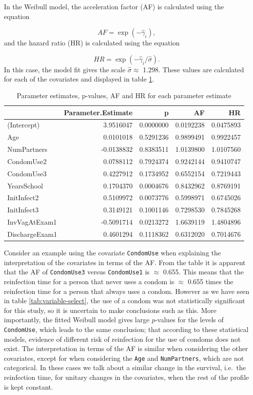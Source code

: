 \documentclass[
]{article}
\begin{document}
In the Weibull model, the acceleration factor (AF) is calculated using the equation

\[
AF = \exp(-\hat{\gamma}_i),
\]
and the hazard ratio (HR) is calculated using the equation

\[
HR = \exp(-\hat{\gamma}_i/\hat{\sigma}).
\]
In this case, the model fit gives the scale \(\hat{\sigma} \approx\) 1.298. These values are calculated for each of the covariates and displayed in table \ref{tab:Weibull-table}.

\begin{table}

\caption{\label{tab:Weibull-table}Parameter estimates, p-values, AF and HR for each parameter estimate}
\centering
\begin{tabular}[t]{l|r|r|r|r}
\hline
  & Parameter.Estimate & p & AF & HR\\
\hline
(Intercept) & 3.9516047 & 0.0000000 & 0.0192238 & 0.0475893\\
\hline
Age & 0.0101018 & 0.5291236 & 0.9899491 & 0.9922457\\
\hline
NumPartners & -0.0138832 & 0.8383511 & 1.0139800 & 1.0107560\\
\hline
CondomUse2 & 0.0788112 & 0.7924374 & 0.9242144 & 0.9410747\\
\hline
CondomUse3 & 0.4227912 & 0.1734952 & 0.6552154 & 0.7219443\\
\hline
YearsSchool & 0.1704370 & 0.0004676 & 0.8432962 & 0.8769191\\
\hline
InitInfect2 & 0.5109972 & 0.0073776 & 0.5998971 & 0.6745026\\
\hline
InitInfect3 & 0.3149121 & 0.1001146 & 0.7298530 & 0.7845268\\
\hline
InvVagAtExam1 & -0.5091714 & 0.0213272 & 1.6639119 & 1.4804896\\
\hline
DischargeExam1 & 0.4601294 & 0.1118362 & 0.6312020 & 0.7014676\\
\hline
\end{tabular}
\end{table}

Consider an example using the covariate \texttt{CondomUse} when explaining the interpretation of the covariates in terms of the AF. From the table it is apparent that the AF of \texttt{CondomUse3} versus \texttt{CondomUse1} is \(\approx\) 0.655. This means that the reinfection time for a person that never uses a condom is \(\approx\) 0.655 times the reinfection time for a person that always uses a condom. However as we have seen in table \ref{tab:variable-select}, the use of a condom was not statistically significant for this study, so it is uncertain to make conclusions such as this. More importantly, the fitted Weibull model gives large \(p\)-values for the levels of \texttt{CondomUse}, which leads to the same conclusion; that according to these statistical models, evidence of different risk of reinfection for the use of condoms does not exist. The interpretation in terms of the AF is similar when considering the other covariates, except for when considering the \texttt{Age} and \texttt{NumPartners}, which are not categorical. In these cases we talk about a similar change in the survival, i.e.~the reinfection time, for unitary changes in the covariates, when the rest of the profile is kept constant.
\end{document}
